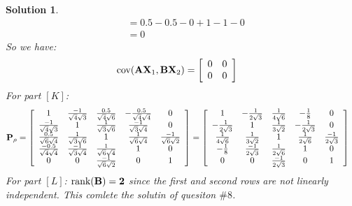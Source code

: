 \documentclass[11pt]{article}\usepackage[]{graphicx}\usepackage[]{color}
\newtheorem{sol}{Solution}
\begin{document}
\begin{sol}
\begin{align*}
	&= 0.5-0.5 - 0 + 1 - 1 - 0\\
	&= 0
	\end{align*}
	So we have:
	\begin{align*}
		\text{cov}({\bf A}{\bf X}_1, {\bf B}{\bf X}_2)  &= \left[\begin{array}{cc} 0& 0\\ 0&0 \end{array}\right]
	\end{align*}
	For part $[K]$:
	\begin{align*}
		{\bf P}_{\rho} &= \left[\begin{array}{ccccc} 1&\frac{-1}{\sqrt{4}\sqrt{3}}&\frac{0.5}{\sqrt{4}{\sqrt{6}}}&-\frac{0.5}{\sqrt{4}\sqrt{4}}&0\\ \frac{-1}{\sqrt{4}\sqrt{3}}&1&\frac{1}{\sqrt{3}\sqrt{6}}&\frac{-1}{\sqrt{3}\sqrt{4}}&0\\ \frac{0.5}{\sqrt{6}\sqrt{4}}&\frac{1}{\sqrt{3}\sqrt{6}}&1&\frac{1}{\sqrt{6}\sqrt{4}}&\frac{-1}{\sqrt{6}\sqrt{2}}\\ \frac{-0.5}{\sqrt{4}\sqrt{4}} &\frac{-1}{\sqrt{3}\sqrt{4}}&\frac{1}{\sqrt{6}\sqrt{4}}&1&0\\ 0&0&\frac{-1}{\sqrt{6}\sqrt{2}}&0&1\end{array}\right] = \left[\begin{array}{ccccc}1&-\frac{1}{2\sqrt{3}}&\frac{1}{4\sqrt{6}}&-\frac{1}{8}&0\\ -\frac{1}{2\sqrt{3}}&1&\frac{1}{3\sqrt{2}}&-\frac{1}{2\sqrt{3}}&0\\ \frac{1}{4\sqrt{6}}&\frac{1}{3\sqrt{2}}&1&\frac{1}{2\sqrt{6}}&\frac{-1}{2\sqrt{3}}\\ -\frac{1}{8}&\frac{-1}{2\sqrt{3}}&\frac{1}{2\sqrt{6}}&1&0\\ 0&0&\frac{-1}{2\sqrt{3}}&0&1\end{array}\right]
	\end{align*}
	For part $[L]$:\vskip 2mm
	$\text{rank}(\bf B) = 2$ since the first and second rows are not linearly independent.\vskip 2mm
	This comlete the solutin of quesiton $\#8$.
\end{sol}
\end{document}
